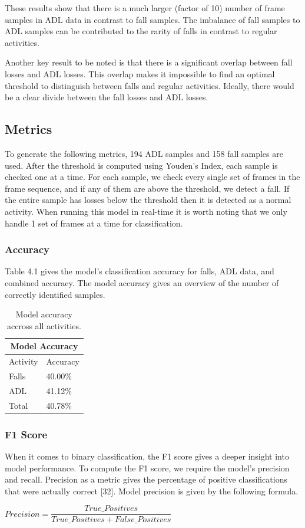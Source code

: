 These results show that there is a much larger (factor of 10) number of frame samples in ADL data in contrast to fall samples. The imbalance of fall samples to ADL samples can be contributed to the rarity of falls in contrast to regular activities. 

Another key result to be noted is that there is a significant overlap between fall losses and ADL losses. This overlap makes it impossible to find an optimal threshold to distinguish between falls and regular activities. Ideally, there would be a clear divide between the fall losses and ADL losses. 

\subsection{Metrics}
To generate the following metrics, 194 ADL samples and 158 fall samples are used. After the threshold is computed using Youden's Index, each sample is checked one at a time. For each sample, we check every single set of frames in the frame sequence, and if any of them are above the threshold, we detect a fall. If the entire sample has losses below the threshold then it is detected as a normal activity. When running this model in real-time it is worth noting that we only handle 1 set of frames at a time for classification. 
\subsubsection{Accuracy}
Table 4.1 gives the model's classification accuracy for falls, ADL data, and combined accuracy. The model accuracy gives an overview of the number of correctly identified samples.

\begin{table}[htp]
    \centering
    \begin{tabular}{ |p{3.5cm}|p{3.0cm}|}
     \hline
     \multicolumn{2}{|c|}{Model Accuracy} \\
     \hline
     Activity& Accuracy\\
     \hline
     \hline
     Falls&40.00\%\\
     \hline
     ADL&41.12\%\\
     \hline
     Total&40.78\%\\
     \hline
    \end{tabular}
    \caption{Model accuracy accross all activities.}
\end{table}
\subsubsection{F1 Score}
When it comes to binary classification, the F1 score gives a deeper insight into model performance. To compute the F1 score, we require the model's precision and recall. Precision as a metric gives the percentage of positive classifications that were actually correct [32]. Model precision is given by the following formula.
\begin{center}
$ Precision = \dfrac{True\_Positives}{True\_Positives + False\_Positives}$
\end{center}

